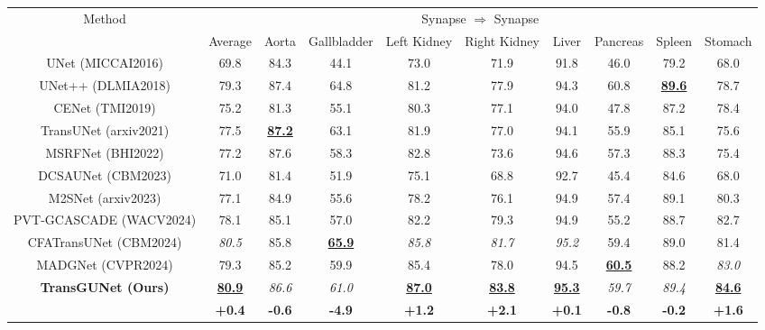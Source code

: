 \begin{table*}[t]
    \centering
    \scriptsize
    \setlength\tabcolsep{9pt} %
    \renewcommand{\arraystretch}{0.6} %
    \begin{tabular}{c|c|cccccccc}
    \hline
    \multicolumn{1}{c|}{\multirow{2}{*}{Method}} & \multicolumn{9}{c}{Synapse $\Rightarrow$ Synapse} \\ \cline{2-10}
     & Average & Aorta & Gallbladder & Left Kidney & Right Kidney & Liver & Pancreas & Spleen & Stomach \\
    \hline
    UNet \tiny{(MICCAI2016)}     & 69.8 & 84.3 & 44.1 & 73.0 & 71.9 & 91.8 & 46.0 & 79.2 & 68.0 \\
    UNet++ \tiny{(DLMIA2018)}    & 79.3 & 87.4 & 64.8 & 81.2 & 77.9 & 94.3 & 60.8 & \textbf{\underline{89.6}} & 78.7 \\
    CENet \tiny{(TMI2019)}       & 75.2 & 81.3 & 55.1 & 80.3 & 77.1 & 94.0 & 47.8 & 87.2 & 78.4 \\
    TransUNet \tiny{(arxiv2021)} & 77.5 & \textbf{\underline{87.2}} & 63.1 & 81.9 & 77.0 & 94.1 & 55.9 & 85.1 & 75.6 \\
    MSRFNet \tiny{(BHI2022)}     & 77.2 & 87.6 & 58.3 & 82.8 & 73.6 & 94.6 & 57.3 & 88.3 & 75.4 \\
    DCSAUNet \tiny{(CBM2023)}    & 71.0 & 81.4 & 51.9 & 75.1 & 68.8 & 92.7 & 45.4 & 84.6 & 68.0 \\
    M2SNet \tiny{(arxiv2023)}    & 77.1 & 84.9 & 55.6 & 78.2 & 76.1 & 94.9 & 57.4 & 89.1 & 80.3 \\
    PVT-GCASCADE \tiny{(WACV2024)} & 78.1 & 85.1 & 57.0 & 82.2 & 79.3 & 94.9 & 55.2 & 88.7 & 82.7 \\
    CFATransUNet \tiny{(CBM2024)} & \textit{80.5} & 85.8 & \textbf{\underline{65.9}} & \textit{85.8} & \textit{81.7} & \textit{95.2} & 59.4 & 89.0 & 81.4 \\
    MADGNet \tiny{(CVPR2024)}    & 79.3 & 85.2 & 59.9 & 85.4 & 78.0 & 94.5 & \textbf{\underline{60.5}} & 88.2 & \textit{83.0} \\
    \hline
    \multicolumn{1}{c|}{\multirow{2}{*}{\textbf{TransGUNet \tiny{(Ours)}}}} & \textbf{\underline{80.9}} & \textit{86.6} & \textit{61.0} & \textbf{\underline{87.0}} & \textbf{\underline{83.8}} & \textbf{\underline{95.3}} & \textit{59.7} & \textit{89.4} & \textbf{\underline{84.6}} \\ \cline{2-10}
    & \textbf{+0.4} & \textbf{-0.6} & \textbf{-4.9} & \textbf{+1.2} & \textbf{+2.1} & \textbf{+0.1} & \textbf{-0.8} & \textbf{-0.2} & \textbf{+1.6} \\

\end{tabular}
\end{table*}
